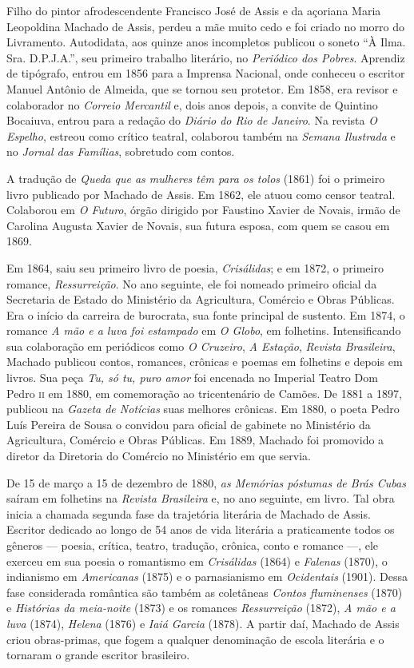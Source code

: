 Filho do pintor afrodescendente Francisco José de Assis e da açoriana
Maria Leopoldina Machado de Assis, perdeu a mãe muito cedo e foi criado
no morro do Livramento. Autodidata, aos quinze anos incompletos publicou
o soneto ``À Ilma. Sra. D.P.J.A.'', seu primeiro trabalho literário,
no \emph{Periódico dos Pobres}. Aprendiz de tipógrafo, entrou em 1856
para a Imprensa Nacional, onde conheceu o escritor Manuel Antônio de
Almeida, que se tornou seu protetor. Em 1858, era revisor e colaborador
no \emph{Correio Mercantil} e, dois anos depois, a convite de Quintino
Bocaiuva, entrou para a redação do \emph{Diário do Rio de Janeiro}. Na
revista \emph{O Espelho}, estreou como crítico teatral, colaborou também
na \emph{Semana Ilustrada} e no \emph{Jornal das Famílias}, sobretudo
com contos.

A tradução de \emph{Queda que as mulheres têm para os tolos} (1861) foi
o primeiro livro publicado por Machado de Assis. Em 1862, ele atuou como
censor teatral. Colaborou em \emph{O Futuro}, órgão dirigido por
Faustino Xavier de Novais, irmão de Carolina Augusta Xavier de Novais,
sua futura esposa, com quem se casou em 1869.

Em 1864, saiu seu primeiro livro de poesia, \emph{Crisálidas}; e em
1872, o primeiro romance, \emph{Ressurreição}. No ano seguinte, ele foi
nomeado primeiro oficial da Secretaria de Estado do Ministério da
Agricultura, Comércio e Obras Públicas. Era o início da carreira de
burocrata, sua fonte principal de sustento. Em 1874, o romance \emph{A
mão e a luva foi estampado} em \emph{O Globo}, em folhetins.
Intensificando sua colaboração em periódicos como \emph{O
Cruzeiro}, \emph{A Estação}, \emph{Revista Brasileira}, Machado publicou
contos, romances, crônicas e poemas em folhetins e depois em livros. Sua
peça \emph{Tu, só tu, puro amor} foi encenada no Imperial Teatro Dom
Pedro \textsc{ii} em 1880, em comemoração ao tricentenário de Camões. De 1881 a
1897, publicou na \emph{Gazeta de Notícias} suas melhores crônicas. Em
1880, o poeta Pedro Luís Pereira de Sousa o convidou para oficial de
gabinete no Ministério da Agricultura, Comércio e Obras Públicas. Em
1889, Machado foi promovido a diretor da Diretoria do Comércio no
Ministério em que servia.

De 15 de março a 15 de dezembro de 1880, \emph{as Memórias póstumas de
Brás Cubas} saíram em folhetins na \emph{Revista Brasileira} e, no ano
seguinte, em livro. Tal obra inicia a chamada segunda fase da trajetória
literária de Machado de Assis. Escritor dedicado ao longo de 54 anos de
vida literária a praticamente todos os gêneros --- poesia, crítica,
teatro, tradução, crônica, conto e romance ---, ele exerceu em sua poesia
o romantismo em \emph{Crisálidas} (1864) e \emph{Falenas} (1870), o
indianismo em \emph{Americanas} (1875) e o parnasianismo
em \emph{Ocidentais} (1901). Dessa fase considerada romântica são também
as coletâneas \emph{Contos fluminenses} (1870) e \emph{Histórias da
meia-noite} (1873) e os romances \emph{Ressurreição} (1872), \emph{A mão
e a luva} (1874), \emph{Helena} (1876) e \emph{Iaiá Garcia} (1878). A
partir daí, Machado de Assis criou obras-primas, que fogem a qualquer
denominação de escola literária e o tornaram o grande escritor
brasileiro.

